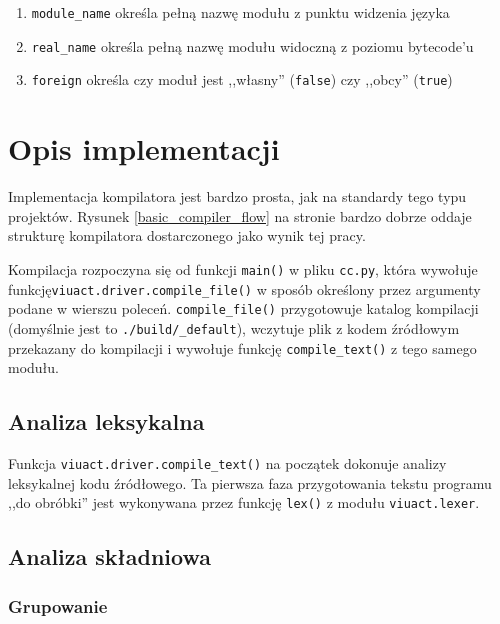 \begin{enumerate}
    \item \texttt{module\_name} określa pełną nazwę modułu z punktu widzenia języka \ViuAct
    \item \texttt{real\_name} określa pełną nazwę modułu widoczną z poziomu bytecode'u
    \item \texttt{foreign} określa czy moduł jest ,,własny'' (\texttt{false}) czy ,,obcy'' (\texttt{true})
\end{enumerate}

\section{Opis implementacji}
\label{viuact_cc_implementation_desc}

Implementacja kompilatora jest bardzo prosta, jak na standardy tego typu projektów.
Rysunek \ref{basic_compiler_flow} na stronie \pageref{basic_compiler_flow} bardzo dobrze oddaje strukturę
kompilatora dostarczonego jako wynik tej pracy.

Kompilacja rozpoczyna się od funkcji \texttt{main()} w pliku \texttt{cc.py},
która wywołuje funkcję\newline\texttt{viuact.driver.compile\_file()} w sposób
określony przez argumenty podane w wierszu poleceń.
\texttt{compile\_file()} przygotowuje katalog kompilacji (domyślnie jest to
\texttt{./build/\_default}), wczytuje plik z kodem źródłowym przekazany do
kompilacji i wywołuje funkcję \texttt{compile\_text()} z tego samego modułu.

\subsection{Analiza leksykalna}
\label{viuact_cc_impl_desc_lex}

Funkcja \texttt{viuact.driver.compile\_text()} na początek dokonuje analizy
leksykalnej kodu źródłowego. Ta pierwsza faza przygotowania tekstu programu ,,do
obróbki'' jest wykonywana przez funkcję \texttt{lex()} z modułu
\texttt{viuact.lexer}.

\subsection{Analiza składniowa}
\label{viuact_cc_impl_desc_parse}

\subsubsection{Grupowanie}

